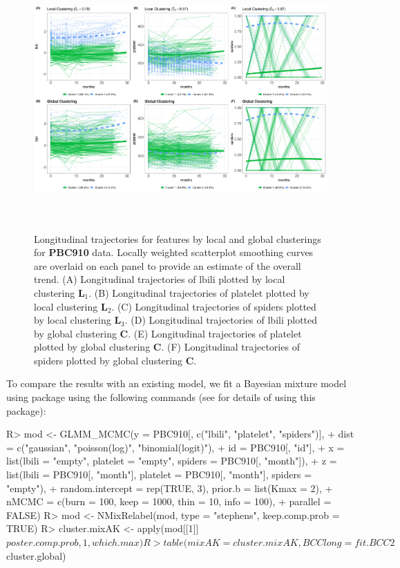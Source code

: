 \begin{figure}[h]
\centering
\includegraphics[width=\textwidth,height=10cm]{./Figures/trajplot_PBC910.JPEG}
\caption{\label{fig:traj} Longitudinal trajectories for features by local and global clusterings for \textbf{PBC910} data. Locally weighted scatterplot smoothing curves are overlaid on each panel to provide an estimate of the overall trend.  (A) Longitudinal trajectories of lbili plotted by local clustering $\boldsymbol{L}_1$. (B) Longitudinal trajectories of platelet plotted by local clustering $\boldsymbol{L}_2$. (C) Longitudinal trajectories of spiders plotted by local clustering $\boldsymbol{L}_3$. (D) Longitudinal trajectories of  lbili plotted by global clustering $\boldsymbol{C}$. (E)  Longitudinal trajectories of platelet plotted by global clustering $\boldsymbol{C}$. (F)  Longitudinal trajectories of spiders plotted by global clustering $\boldsymbol{C}$.}
\end{figure}

To compare the results with an existing  model, we fit a Bayesian mixture model using  package using the following commands (see \citep{Komarek2014} for details of using this package): 

\begin{example}
R> mod <- GLMM_MCMC(y = PBC910[, c("lbili", "platelet", "spiders")],
+        dist = c("gaussian", "poisson(log)", "binomial(logit)"),
+        id = PBC910[, "id"], 
+        x = list(lbili = "empty", platelet = "empty", spiders = PBC910[, "month"]), 
+        z = list(lbili = PBC910[, "month"], platelet = PBC910[, "month"], spiders = "empty"),
+        random.intercept = rep(TRUE, 3), prior.b = list(Kmax = 2),
+        nMCMC = c(burn = 100, keep = 1000, thin = 10, info = 100),
+        parallel = FALSE)
R> mod <- NMixRelabel(mod, type = "stephens", keep.comp.prob = TRUE)
R> cluster.mixAK <- apply(mod[[1]]$poster.comp.prob, 1, which.max)
R> table(mixAK = cluster.mixAK, BCClong = fit.BCC2$cluster.global)
\end{example} 

